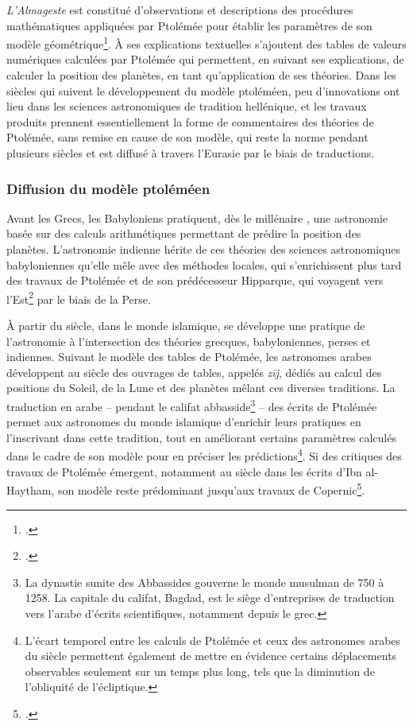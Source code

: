 \textit{L'Almageste} est constitué d'observations et descriptions des procédures mathématiques appliquées par Ptolémée pour établir les paramètres de son modèle géométrique\footcite{evansHistoryAstronomy}. À ses explications textuelles s'ajoutent des tables de valeurs numériques calculées par Ptolémée qui permettent, en suivant ses explications, de calculer la position des planètes, en tant qu'application de ses théories. Dans les siècles qui suivent le développement du modèle ptoléméen, peu d'innovations ont lieu dans les sciences astronomiques de tradition hellénique, et les travaux produits prennent essentiellement la forme de commentaires des théories de Ptolémée, sans remise en cause de son modèle, qui reste la norme pendant plusieurs siècles et est diffusé à travers l'Eurasie par le biais de traductions.

    \subsubsection{Diffusion du modèle ptoléméen}
Avant les Grecs, les Babyloniens pratiquent, dès le \ist millénaire \jc, une astronomie basée sur des calculs arithmétiques permettant de prédire la position des planètes. L'astronomie indienne hérite de ces théories des sciences astronomiques babyloniennes qu'elle mêle avec des méthodes locales, qui s'enrichissent plus tard des travaux de Ptolémée et de son prédécesseur Hipparque, qui voyagent vers l'Est\footcite{evansHistoryAstronomy} par le biais de la Perse.

À partir du \viii siècle, dans le monde islamique, se développe une pratique de l'astronomie à l'intersection des théories grecques, babyloniennes, perses et indiennes. Suivant le modèle des tables de Ptolémée, les astronomes arabes développent au \ix siècle des ouvrages de tables, appelés \textit{zīj}, dédiés au calcul des positions du Soleil, de la Lune et des planètes mêlant ces diverses traditions. La traduction en arabe -- pendant le califat abbasside\footnote{La dynastie sunite des Abbassides gouverne le monde musulman de 750 à 1258. La capitale du califat, Bagdad, est le siège d'entreprises de traduction vers l'arabe d'écrits scientifiques, notamment depuis le grec.} -- des écrits de Ptolémée permet aux astronomes du monde islamique d'enrichir leurs pratiques en l'inscrivant dans cette tradition, tout en améliorant certains paramètres calculés dans le cadre de son modèle pour en préciser les prédictions\footnote{L'écart temporel entre les calculs de Ptolémée et ceux des astronomes arabes du \ix siècle permettent également de mettre en évidence certains déplacements observables seulement sur un temps plus long, tels que la diminution de l'obliquité de l'écliptique.}. Si des critiques des travaux de Ptolémée émergent, notamment au \xie siècle dans les écrits d'Ibn al-Haytham, son modèle reste prédominant jusqu'aux travaux de Copernic\footcite{evansHistoryAstronomy}.

